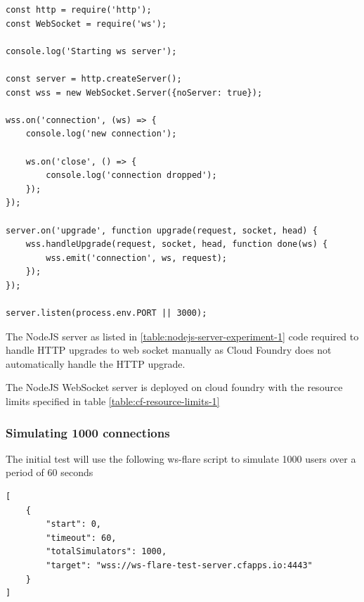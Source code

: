 \begin{listing}[H]
    \caption{NodeJS Websocket Server Implemntation}
    \label{table:nodejs-server-experiment-1}
    \begin{verbatim}
const http = require('http');
const WebSocket = require('ws');

console.log('Starting ws server');

const server = http.createServer();
const wss = new WebSocket.Server({noServer: true});

wss.on('connection', (ws) => {
    console.log('new connection');

    ws.on('close', () => {
        console.log('connection dropped');
    });
});

server.on('upgrade', function upgrade(request, socket, head) {
    wss.handleUpgrade(request, socket, head, function done(ws) {
        wss.emit('connection', ws, request);
    });
});

server.listen(process.env.PORT || 3000);
\end{verbatim}
\end{listing}

The NodeJS server as listed in \ref{table:nodejs-server-experiment-1} code required to handle HTTP upgrades to web socket manually as Cloud Foundry does not automatically handle the HTTP upgrade.

The NodeJS WebSocket server is deployed on cloud foundry with the resource limits specified in table \ref{table:cf-resource-limits-1}

\begin{table}[H]
\caption{Cloud Foundry Resource Limits}
\label{table:cf-resource-limits-1}
\end{table}

\subsubsection{Simulating 1000 connections}
The initial test will use the following ws-flare script to simulate 1000 users over a period of 60 seconds

\begin{listing}[H]
    \caption{WS-Flare test script for 1000 users}
    \label{table:nodejs-server-experiment-1}
    \begin{verbatim}
[
    {
        "start": 0,
        "timeout": 60,
        "totalSimulators": 1000,
        "target": "wss://ws-flare-test-server.cfapps.io:4443"
    }
]
\end{verbatim}
\end{listing}

